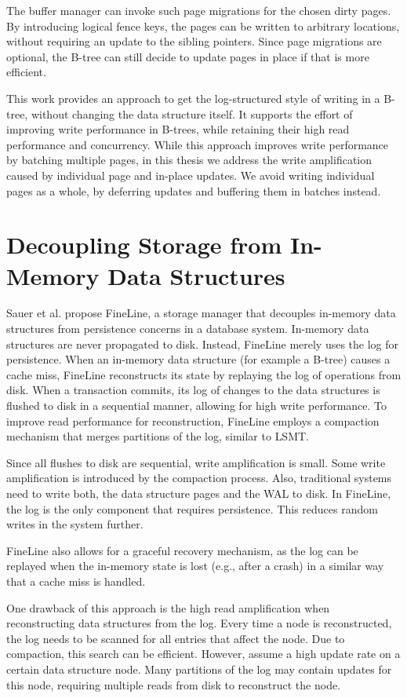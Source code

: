 The buffer manager can invoke such page migrations for the chosen dirty pages.
By introducing logical fence keys, the pages can be written to arbitrary locations, without requiring an update to the sibling pointers.
Since page migrations are optional, the B-tree can still decide to update pages in place if that is more efficient.

This work provides an approach to get the log-structured style of writing in a B-tree, without changing the data structure itself.
It supports the effort of improving write performance in B-trees, while retaining their high read performance and concurrency.
While this approach improves write performance by batching multiple pages, in this thesis we address the write amplification caused by individual page and in-place updates.
We avoid writing individual pages as a whole, by deferring updates and buffering them in batches instead.

\section{Decoupling Storage from In-Memory Data Structures}
\label{sec:related-work-fineline}
Sauer et al. \cite{sauer2018fineline} propose FineLine, a storage manager that decouples in-memory data structures from persistence concerns in a database system.
In-memory data structures are never propagated to disk.
Instead, FineLine merely uses the log for persistence.
When an in-memory data structure (for example a B-tree) causes a cache miss, FineLine reconstructs its state by replaying the log of operations from disk.
When a transaction commits, its log of changes to the data structures is flushed to disk in a sequential manner, allowing for high write performance.
To improve read performance for reconstruction, FineLine employs a compaction mechanism that merges partitions of the log, similar to \ac{LSMT}.

Since all flushes to disk are sequential, write amplification is small.
Some write amplification is introduced by the compaction process.
Also, traditional systems need to write both, the data structure pages and the \ac{WAL} to disk.
In FineLine, the log is the only component that requires persistence.
This reduces random writes in the system further.

FineLine also allows for a graceful recovery mechanism, as the log can be replayed when the in-memory state is lost (e.g., after a crash) in a similar way that a cache miss is handled.

One drawback of this approach is the high read amplification when reconstructing data structures from the log.
Every time a node is reconstructed, the log needs to be scanned for all entries that affect the node.
Due to compaction, this search can be efficient.
However, assume a high update rate on a certain data structure node.
Many partitions of the log may contain updates for this node, requiring multiple reads from disk to reconstruct the node.

